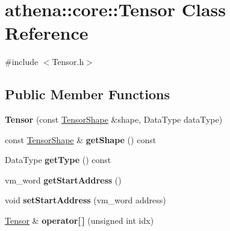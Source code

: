 \hypertarget{classathena_1_1core_1_1_tensor}{}\section{athena\+:\+:core\+:\+:Tensor Class Reference}
\label{classathena_1_1core_1_1_tensor}


{\ttfamily \#include $<$Tensor.\+h$>$}

\subsection*{Public Member Functions}
\begin{DoxyCompactItemize}
\item 
\mbox{\label{classathena_1_1core_1_1_tensor_a73df0da6b63c55ef90c4941aa23acc54}} 
{\bfseries Tensor} (const \mbox{\hyperlink{classathena_1_1core_1_1_tensor_shape}{Tensor\+Shape}} \&shape, Data\+Type data\+Type)
\item 
\mbox{\label{classathena_1_1core_1_1_tensor_af07b079821aadb1ec80c98b14617f2cb}} 
const \mbox{\hyperlink{classathena_1_1core_1_1_tensor_shape}{Tensor\+Shape}} \& {\bfseries get\+Shape} () const
\item 
\mbox{\label{classathena_1_1core_1_1_tensor_ac808b57b581b28ef78244bdc1f7eba0e}} 
Data\+Type {\bfseries get\+Type} () const
\item 
\mbox{\label{classathena_1_1core_1_1_tensor_ae864cbc773fa869a90bce479f03dbf68}} 
vm\+\_\+word {\bfseries get\+Start\+Address} ()
\item 
\mbox{\label{classathena_1_1core_1_1_tensor_a863c18e892c319b1e7fd359ddc7282ca}} 
void {\bfseries set\+Start\+Address} (vm\+\_\+word address)
\item 
\mbox{\label{classathena_1_1core_1_1_tensor_a98c05789432a4201a92ed2f7221d6882}} 
\mbox{\hyperlink{classathena_1_1core_1_1_tensor}{Tensor}} \& {\bfseries operator\mbox{[}$\,$\mbox{]}} (unsigned int idx)
\end{DoxyCompactItemize}


